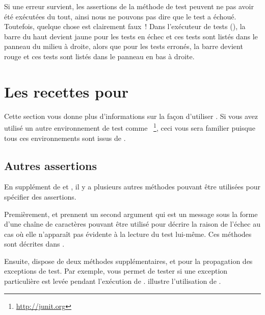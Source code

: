 \documentclass[a4paper,10pt,twoside]{book}
\begin{document}
Si une erreur survient, les assertions de la méthode de test peuvent ne pas avoir été exécutées du tout, ainsi nous ne pouvons pas dire que le test a échoué. 
Toutefois, quelque chose est clairement faux~!
Dans l'exécuteur de tests (), la barre du haut devient jaune pour les tests en échec et ces tests sont listés dans le panneau du milieu à droite, alors que pour les tests erronés, la barre devient rouge et ces tests sont listés dans le panneau en bas à droite.


\section{Les recettes pour \SUnit}
Cette section vous donne plus d'informations sur la façon d'utiliser \SUnit. Si vous avez utilisé un autre environnement de test comme \JUnit~\footnote{\url{http://junit.org}}, ceci vous sera familier puisque tous ces environnements sont issus de  \SUnit. 


\subsection{Autres assertions}
En supplément de  et , il y a plusieurs autres méthodes pouvant être utilisées pour spécifier des assertions. 



Premièrement,  et  prennent un second argument qui est un message sous la forme d'une chaîne de caractères pouvant être utilisé pour décrire la raison de l'échec au cas où elle n'apparaît pas évidente à la lecture du test lui-même. Ces méthodes sont décrites dans .



Ensuite, \sunit dispose de deux méthodes supplémentaires,  et   pour la propagation des exceptions de test. Par exemple,  vous permet de tester si une exception particulière est levée pendant l'exécution de .  illustre l'utilisation de \mbox{}.
\end{document}
